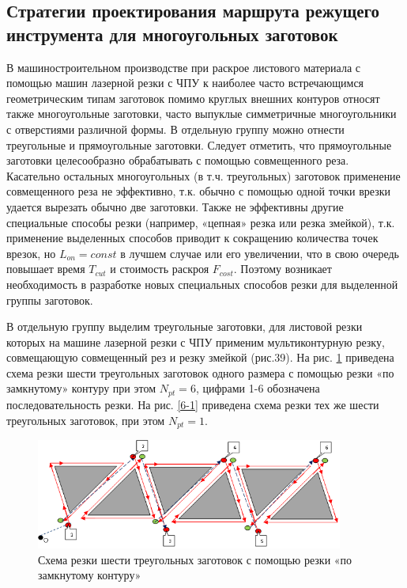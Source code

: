 \documentclass[12pt,twoside]{report}
\begin{document}
\subsection{Стратегии проектирования маршрута режущего инструмента для многоугольных заготовок}

В машиностроительном производстве
при раскрое листового материала с помощью машин лазерной резки с ЧПУ
к наиболее часто встречающимся геометрическим
типам заготовок помимо круглых внешних контуров
относят также многоугольные заготовки,
часто выпуклые симметричные многоугольники с отверстиями различной формы.
В отдельную группу можно отнести треугольные и прямоугольные заготовки.
Следует отметить, что прямоугольные заготовки целесообразно обрабатывать
с помощью совмещенного реза.
Касательно остальных многоугольных (в т.ч. треугольных)
заготовок применение совмещенного реза не эффективно,
т.к. обычно с помощью одной точки врезки удается вырезать обычно две заготовки.
Также не эффективны другие специальные способы резки
(например, «цепная» резка или резка змейкой),
т.к. применение выделенных способов приводит к
сокращению количества точек врезок,
но
$L_{on}=const$
в лучшем случае или его увеличении,
что в свою очередь повышает время
$T_{cut}$
и стоимость раскроя
$F_{cost}$.
Поэтому возникает необходимость в разработке
новых специальных способов резки для выделенной группы заготовок.

В отдельную группу выделим треугольные заготовки,
для листовой резки которых на машине лазерной резки с ЧПУ
применим мультиконтурную резку,
совмещающую совмещенный рез и резку змейкой (рис.39).
На рис. \ref{6-6} приведена схема резки шести треугольных заготовок
одного размера с помощью резки «по замкнутому» контуру при этом
$N_{pt}=6$,
цифрами 1-6 обозначена последовательность резки.
На рис. \ref{6-1} приведена схема резки тех же шести
треугольных заготовок, при этом
$N_{pt}=1$.

\begin{figure}
  \begin{center}
  \includegraphics[width=0.9\textwidth]{6-6.png}
  \caption{Схема резки шести треугольных заготовок с помощью резки «по замкнутому контуру»}
  \label{6-6}
  \end{center}
\end{figure}
\end{document}
